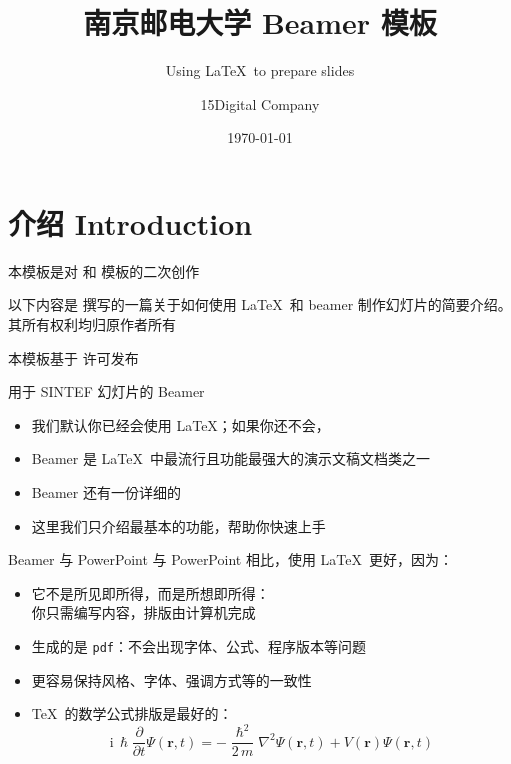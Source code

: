 \documentclass{beamer}
\title{南京邮电大学 Beamer 模板}
\subtitle{Using \LaTeX\ to prepare slides}
\author{15Digital Company}
\date{\today}
\begin{document}
\maketitle

\section{介绍 Introduction}

\begin{frame}
    本模板是对  和  模板的二次创作 \vspace{\baselineskip}

    以下内容是  撰写的一篇关于如何使用 \LaTeX\ 和 beamer 制作幻灯片的简要介绍。其所有权利均归原作者所有\vspace{\baselineskip}

    本模板基于  许可发布
\end{frame}

\begin{frame}{用于 SINTEF 幻灯片的 Beamer}
    \begin{itemize}
        \item 我们默认你已经会使用 \LaTeX；如果你还不会，
        \item Beamer 是 \LaTeX\ 中最流行且功能最强大的演示文稿文档类之一
        \item Beamer 还有一份详细的
        \item 这里我们只介绍最基本的功能，帮助你快速上手
    \end{itemize}
\end{frame}

\begin{frame}{Beamer 与 PowerPoint}
    与 PowerPoint 相比，使用 \LaTeX\ 更好，因为：
    \begin{itemize}
        \item 它不是所见即所得，而是所想即所得：\\
              你只需编写内容，排版由计算机完成
        \item 生成的是 \texttt{pdf}：不会出现字体、公式、程序版本等问题
        \item 更容易保持风格、字体、强调方式等的一致性
        \item \TeX\ 的数学公式排版是最好的：
              \begin{equation*}
                  \mathrm{i}\,\hslash\frac{\partial}{\partial t} \Psi(\mathbf{r},t) =
                  -\frac{\hslash^2}{2\,m}\nabla^2\Psi(\mathbf{r},t)
                  + V(\mathbf{r})\Psi(\mathbf{r},t)
              \end{equation*}
    \end{itemize}
\end{frame}
\end{document}
